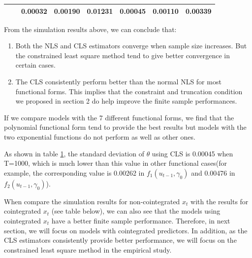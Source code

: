 \documentclass[a4paper,12pt,times,numbered,print,index]{report}
\numberwithin{equation}{section}
\begin{document}
\begin{table}[htbp]
\begin{adjustbox}{max width=\textwidth}
\begin{tabular}{cccccccccccccccc}
          &       & \multicolumn{2}{c}{0.00032} & \multicolumn{2}{c}{\textcolor[rgb]{ .329,  .51,  .208}{0.00190}} & \multicolumn{3}{c}{\textcolor[rgb]{ .329,  .51,  .208}{0.01231}} & \multicolumn{2}{c}{0.00045} & \multicolumn{2}{c}{\textcolor[rgb]{ .329,  .51,  .208}{0.00110}} & \multicolumn{3}{c}{\textcolor[rgb]{ .329,  .51,  .208}{0.00339}} \\
    \bottomrule
    \bottomrule
    \end{tabular}%
    \end{adjustbox}
  \label{s_f7}%
\end{table}%

From the simulation results above, we can conclude that:
\begin{enumerate}
    \item Both the NLS and CLS estimators converge when sample size increases. But the constrained least square method tend to give better convergence in certain cases.
    
    \item The CLS consistently perform better than the normal NLS for most functional forms. This implies that the constraint and truncation condition we proposed in section 2 do help improve the finite sample performances. 
\end{enumerate}

If we compare models with the 7 different functional forms,  we find that the polynomial functional form tend to provide the best results but models with the two exponential functions do not perform as well as other ones. 

As shown in table \ref{s_f7}, the standard deviation of $\theta$ using CLS is 0.00045 when T=1000, which is much lower than this value in other functional cases(for example, the corresponding value is 0.00262 in $f_1(u_{t-1}, \gamma_0)$ and 0.00476 in $f_2(u_{t-1}, \gamma_0)$). 

When compare the simulation results for non-cointegrated $x_t$ with the results for cointegrated $x_t$ (see table below), we can also see that the models using cointegrated $x_t$ have a better finite sample performance. Therefore, in next section, we will focus on models with cointegrated predictors. In addition, as the CLS estimators consistently provide better performance, we will focus on the constrained least square method in the empirical study.
\end{document}
